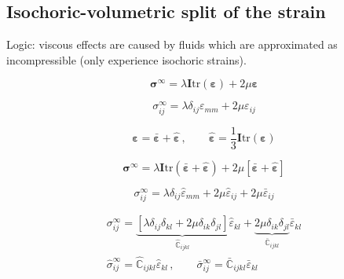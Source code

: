 \documentclass[12pt]{article}
\newcommand{\tr}{\text{tr}}
\begin{document}
\subsection{Isochoric-volumetric split of the strain}
Logic: viscous effects are caused by fluids which are approximated as incompressible (only experience isochoric strains).


\begin{equation}
\bm{\sigma}^{\infty} = \lambda \bm{I}\tr\left(\bm{\varepsilon}\right) + 2\mu \bm{\varepsilon}
\end{equation}

\begin{equation}
\sigma_{ij}^{\infty} = \lambda \delta_{ij}\varepsilon_{mm} + 2\mu \varepsilon_{ij}
\end{equation}


\begin{equation}
\bm{\varepsilon} = \bar{\bm{\varepsilon}} + \hat{\bm{\varepsilon}} \,, \qquad \hat{\bm{\varepsilon}} = \dfrac{1}{3}\bm{I} \tr\left(\bm{\varepsilon}\right)
\end{equation}

\begin{equation}
\bm{\sigma}^{\infty} = \lambda \bm{I}\tr\left(\bar{\bm{\varepsilon}} + \hat{\bm{\varepsilon}}\right) + 2\mu \left[\bar{\bm{\varepsilon}} + \hat{\bm{\varepsilon}}\right]
\end{equation}

\begin{equation}
\sigma_{ij}^{\infty} = \lambda \delta_{ij} \hat{\varepsilon}_{mm} + 2\mu \hat{\varepsilon}_{ij} + 2\mu \bar{\varepsilon}_{ij}
\end{equation}


\begin{equation}
\begin{aligned}
\sigma_{ij}^{\infty} = \underbrace{\left[\lambda \delta_{ij} \delta_{kl}  + 2\mu \delta_{ik} \delta_{jl}\right]}_{\hat{\mathbb{C}}_{ijkl}} \hat{\varepsilon}_{kl} + \underbrace{2\mu \delta_{ik} \delta_{jl}}_{\bar{\mathbb{C}}_{ijkl}} \bar{\varepsilon}_{kl}\\
\hat{\sigma}_{ij}^{\infty} = \hat{\mathbb{C}}_{ijkl}\hat{\varepsilon}_{kl}\,,\qquad \bar{\sigma}_{ij}^{\infty}= \bar{\mathbb{C}}_{ijkl} \bar{\varepsilon}_{kl}
\end{aligned}
\end{equation}
\end{document}
